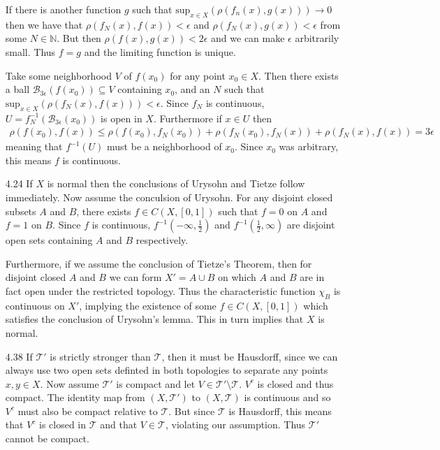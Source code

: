 \documentclass[11pt,letter]{article}
\begin{document}
\begin{enumerate}
    If there is another function $g$ such that $\text{sup}_{x\in X}(\rho(f_n(x),g(x))) \rightarrow 0$ then we have that $\rho(f_N(x),f(x)) < \epsilon$ and $\rho(f_N(x), g(x)) < \epsilon$ from some $N \in \mathbb{N}$. But then $\rho(f(x),g(x)) < 2\epsilon$ and we can make $\epsilon$ arbitrarily small. Thus $f = g$ and the limiting function is unique.

    Take some neighborhood $V$ of $f(x_0)$ for any point $x_0 \in X$. Then there exists a ball $\mathcal{B}_{3\epsilon}(f(x_0)) \subseteq V$ containing $x_0$, and an $N$ such that $\text{sup}_{x\in X}(\rho(f_N(x),f(x))) < \epsilon$. Since $f_N$ is continuous, $U = f_N^{-1}(\mathcal{B}_{3\epsilon}(x_0))$ is open in $X$. Furthermore if $x \in U$ then
    \begin{align*}
        \rho(f(x_0),f(x)) \le \rho(f(x_0), f_N(x_0)) + \rho(f_N(x_0), f_N(x)) + \rho(f_N(x), f(x)) = 3\epsilon
    \end{align*}
    meaning that $f^{-1}(U)$ must be a neighborhood of $x_0$. Since $x_0$ was arbitrary, this means $f$ is continuous.

    \item[4.24] If $X$ is normal then the conclusions of Urysohn and Tietze follow immediately. Now assume the conculsion of Urysohn. For any disjoint closed subsets $A$ and $B$, there exists $f \in C(X,[0,1])$ such that $f=0$ on $A$ and $f=1$ on $B$. Since $f$ is continuous, $f^{-1}(-\infty,\frac{1}{2})$ and $f^{-1}(\frac{1}{2}, \infty)$ are disjoint open sets containing $A$ and $B$ respectively.
    
    Furthermore, if we assume the conclusion of Tietze's Theorem, then for disjoint closed $A$ and $B$ we can form $X' = A \cup B$ on which $A$ and $B$ are in fact open under the restricted topology. Thus the characteristic function $\chi_B$ is continuous on $X'$, implying the existence of some $f \in C(X,[0,1])$ which satisfies the conclusion of Urysohn's lemma. This in turn implies that $X$ is normal.
    
    \item[4.38] If $\mathcal{T}'$ is strictly stronger than $\mathcal{T}$, then it must be Hausdorff, since we can always use two open sets definted in both topologies to separate any points $x,y \in X$. Now assume $\mathcal{T}'$ is compact and let $V \in \mathcal{T}'\setminus \mathcal{T}$. $V^c$ is closed and thus compact. The identity map from $(X,\mathcal{T}')$ to $(X,\mathcal{T})$ is continuous and so $V^c$ must also be compact relative to $\mathcal{T}$. But since $\mathcal{T}$ is Hausdorff, this means that $V^c$ is closed in $\mathcal{T}$ and that $V \in \mathcal{T}$, violating our assumption. Thus $\mathcal{T}'$ cannot be compact.
    

\end{enumerate}
\end{document}
